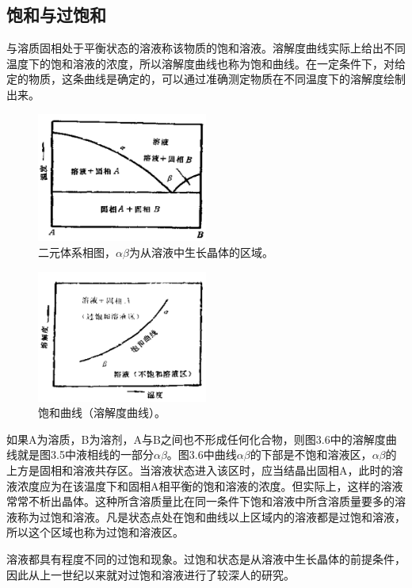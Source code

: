 ﻿\subsection{饱和与过饱和}
与溶质固相处于平衡状态的溶液称该物质的饱和溶液。溶解度曲线实际上给出不同温度下的饱和溶液的浓度，所以溶解度曲线也称为饱和曲线。在一定条件下，对给定的物质，这条曲线是确定的，可以通过准确测定物质在不同温度下的溶解度绘制出来。

\begin{figure}[hbp]
 \centering
 \includegraphics[width=0.5\textwidth]{fig/cp03/img3.5.jpg}
 \caption{二元体系相图，$\alpha\beta$为从溶液中生长晶体的区域。}
\end{figure}

\begin{figure}[htpb]
 \centering
 \includegraphics[width=0.5\textwidth]{fig/cp03/img3.6.jpg}
 \caption{饱和曲线（溶解度曲线）。}
\end{figure}
如果A为溶质，B为溶剂，A与B之间也不形成任何化合物，则图3.6中的溶解度曲线就是图3.5中液相线的一部分$\alpha\beta$。图3.6中曲线$\alpha\beta$的下部是不饱和溶液区，$\alpha\beta$的上方是固相和溶液共存区。当溶液状态进入该区时，应当结晶出固相A，此时的溶液浓度应为在该温度下和固相A相平衡的饱和溶液的浓度。但实际上，这样的溶液常常不析出晶体。这种所含溶质量比在同一条件下饱和溶液中所含溶质量要多的溶液称为过饱和溶液。凡是状态点处在饱和曲线以上区域内的溶液都是过饱和溶液，所以这个区域也称为过饱和溶液区。

溶液都具有程度不同的过饱和现象。过饱和状态是从溶液中生长晶体的前提条件，因此从上一世纪以来就对过饱和溶液进行了较深人的研究。

